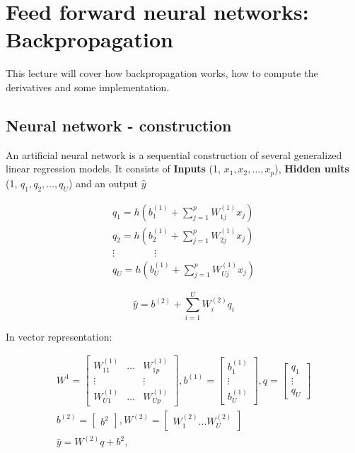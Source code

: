 \section{Feed forward neural networks: Backpropagation}
This lecture will cover how backpropagation works, how to compute the derivatives and some implementation. 

\subsection*{Neural network - construction}
An artificial neural network is a sequential construction of several generalized linear regression models. It consists of \textbf{Inputs} (1, $x_1, x_2, \ldots, x_p$), \textbf{Hidden units} (1, $q_1,q_2,\ldots, q_U$) and an output $\hat{y}$

	\begin{equation}
	\begin{aligned}
		q_1 = h(b^{(1)}_1 + \sum_{j=1}^{p}W^{(1)}_{1j}x_j) \\
		q_2 = h(b^{(1)}_2 + \sum_{j=1}^{p}W^{(1)}_{2j}x_j) \\
		\vdots \quad \quad \quad \quad \vdots \\
		q_U = h(b^{(1)}_U + \sum_{j=1}^{p}W^{(1)}_{Uj}x_j)
	\end{aligned}
	\end{equation}

	\begin{equation}
		\hat{y} = b^{(2)} + \sum_{i=1}^{U}W^{(2)}_iq_i
	\end{equation}


In vector representation:

	\begin{equation}
	\begin{aligned}
		W^{1} = \begin{bmatrix} W^{(1)}_{11} & \ldots& W^{(1)}_{1p} \\ \vdots& & \vdots \\ W^{(1)}_{U1} & \ldots& W^{(1)}_{Up}  \end{bmatrix} , b^{(1)} = \begin{bmatrix} b^{(1)}_1 \\ \vdots \\ b^{(1)}_U \end{bmatrix}, q = \begin{bmatrix} q_1 \\ \vdots \\ q_U \end{bmatrix} \\
		 b^{(2)} = \begin{bmatrix} b^{2} \end{bmatrix}, W^{(2)} = \begin{bmatrix} W^{(2)}_1 \ldots W^{(2)}_U \end{bmatrix} \\
		 \hat{y} = W^{(2)}q + b^{2} ,
	\end{aligned}
	\end{equation}

